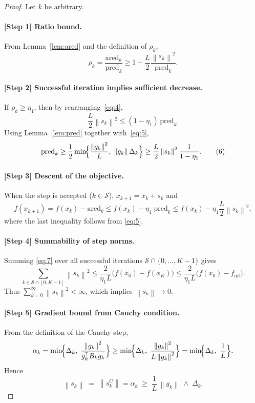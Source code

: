 \documentclass{article}
\newcommand{\norm}[1]{\left\lVert #1 \right\rVert}
\begin{document}
\begin{proof}
Let $k$ be arbitrary.

\paragraph{[Step 1] Ratio bound.}
From Lemma~\ref{lem:ared} and the definition of $\rho_k$,
\[
\rho_k
= \frac{\text{ared}_k}{\text{pred}_k}
\ge 1 - \frac{L}{2}\frac{\norm{s_k}^2}{\text{pred}_k}.
\tag{4}
\]

\paragraph{[Step 2] Successful iteration implies sufficient decrease.}
If $\rho_k\ge\eta_1$, then by rearranging~\eqref{eq:4},
\[
\frac{L}{2}\norm{s_k}^2\le (1-\eta_1)\,\text{pred}_k .
\tag{5}
\]
Using Lemma~\ref{lem:pred} together with~\eqref{eq:5},
\[
\text{pred}_k
\ge \frac{1}{2}\min\!\Bigl\{\frac{\norm{g_k}^2}{L},\;\norm{g_k}\Delta_k\Bigr\}
\ge \frac{L}{2}\norm{s_k}^2\frac{1}{1-\eta_1}.
\tag{6}
\]

\paragraph{[Step 3] Descent of the objective.}
When the step is accepted ($k\in\mathcal{S}$), $x_{k+1}=x_k+s_k$ and
\[
f(x_{k+1}) = f(x_k)-\text{ared}_k
\le f(x_k)-\eta_1\;\text{pred}_k
\le f(x_k)-\eta_1\frac{L}{2}\norm{s_k}^2,
\tag{7}
\]
where the last inequality follows from \eqref{eq:5}.

\paragraph{[Step 4] Summability of step norms.}
Summing \eqref{eq:7} over all successful iterations $\mathcal{S}\cap\{0,\dots,K-1\}$ gives
\[
\sum_{k\in\mathcal{S}\cap[0,K-1]}\norm{s_k}^2
\le \frac{2}{\eta_1 L}\bigl(f(x_0)-f(x_K)\bigr)
\le \frac{2}{\eta_1 L}\bigl(f(x_0)-f_{\inf}\bigr).
\tag{8}
\]
Thus $\sum_{k=0}^{\infty}\norm{s_k}^2<\infty$, which implies $\norm{s_k}\to0$.

\paragraph{[Step 5] Gradient bound from Cauchy condition.}
From the definition of the Cauchy step,
\[
\alpha_k = \min\!\Bigl\{\Delta_k,\;\frac{\norm{g_k}^2}{g_k^{\!\top}B_k g_k}\Bigr\}
\ge \min\!\Bigl\{\Delta_k,\;\frac{\norm{g_k}^2}{L\norm{g_k}^2}\Bigr\}
= \min\!\Bigl\{\Delta_k,\;\frac{1}{L}\Bigr\}.
\]
Hence
\[
\norm{s_k}\;=\;\norm{s^{\mathrm{C}}_k}
= \alpha_k \;\ge\; \frac{1}{L}\,\norm{g_k}\;\wedge\;\Delta_k .
\tag{9}
\]


\end{proof}
\end{document}
